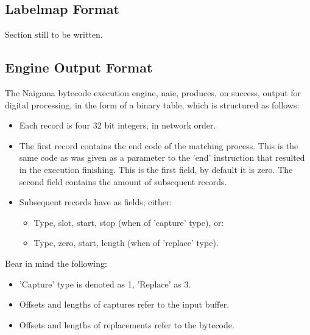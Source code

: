 \subsection{Labelmap Format}

Section still to be written.

\subsection{Engine Output Format}

The Naigama bytecode execution engine, naie, produces, on success, output for
digital processing, in the form of a binary table, which is structured
as follows:

\begin{itemize}

\item Each record is four 32 bit integers, in network order.

\item The first record contains the end code of the matching process.
This is the same code as was given as a parameter to the 'end'
instruction that resulted in the execution finishing. This is the
first field, by default it is zero.
The second field contains the amount of subsequent records.

\item Subsequent records have as fields, either:

\begin{itemize}
\item Type, slot, start, stop (when of 'capture' type), or:
\item Type, zero, start, length (when of 'replace' type).
\end{itemize}

\end{itemize}

Bear in mind the following:

\begin{itemize}
\item 'Capture' type is denoted as 1, 'Replace' as 3.
\item Offsets and lengths of captures refer to the input buffer.
\item Offsets and lengths of replacements refer to the bytecode.
\end{itemize}

